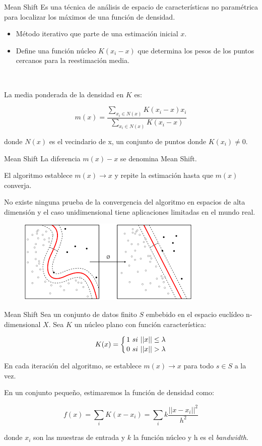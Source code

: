 \documentclass[spanish]{beamer}
\begin{document}
\begin{frame}{Mean Shift}
Es una técnica de análisis de espacio de características no paramétrica para localizar los máximos de una función de densidad. 
\begin{itemize}
\item Método iterativo que parte de una estimación inicial $x$.
\item Define una función núcleo $K(x_i-x)$ que determina los pesos de los puntos cercanos para la reestimación media.
\end{itemize}\

La media ponderada de la densidad en $K$ es:

$$m(x)=\dfrac{\sum_{x_i\in N(x)}K(x_i-x)x_i}{\sum_{x_i\in N(x)}K(x_i-x)}$$

donde $N(x)$ es el vecindario de x, un conjunto de puntos donde $K(x_i)\neq0$.\\
\end{frame}

\begin{frame}{Mean Shift}
La diferencia $m(x)-x$ se denomina Mean Shift.\break

El algoritmo establece $m(x)\rightarrow x$ y repite la estimación hasta que $m(x)$ converja.\break

No existe ninguna prueba de la convergencia del algoritmo en espacios de alta dimensión y el caso unidimensional tiene aplicaciones limitadas en el mundo real.

\begin{figure}[h]
\centering
\includegraphics[scale=0.45]{dani/MS.png}
\end{figure}
\end{frame}

\begin{frame}{Mean Shift}
Sea un conjunto de datos finito $S$ embebido en el espacio euclídeo n-dimensional $X$. Sea $K$ un núcleo plano con función característica:

$$K(x)=\left\{
1 \ si \ ||x||\leq \lambda \atop
0 \ si \ ||x||> \lambda
\right.$$

En cada iteración del algoritmo, se establece $m(x)\rightarrow x$ para todo $s\in S$ a la vez.\break 

En un conjunto pequeño, estimaremos la función de densidad como:

$$f(x)=\sum_i K(x-x_i)=\sum_i k\dfrac{||x-x_i||^2}{h^2}$$

donde $x_i$ son las muestras de entrada y $k$ la función núcleo y h es el \textit{bandwidth}. 
\end{frame}
\end{document}
